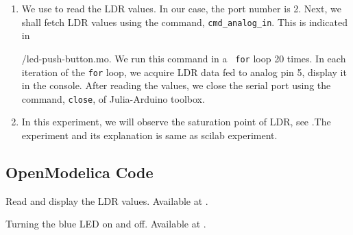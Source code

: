 \begin{enumerate}
\item We use  to read the LDR values. In
  our case, the port number is 2. Next, we shall fetch LDR values
  using the command, {\tt cmd\_analog\_in}. This is indicated in 
  
  {\LocPushOpenModelicacode/led-push-button.mo}. We run this command in a {\tt
    for} loop 20 times. In each iteration of the {\tt for} loop, we
  acquire LDR data fed to analog pin 5, display it in the console. 
  After reading the values, we close the serial port using the
  command, {\tt close}, of Julia-Arduino toolbox.

\item In this experiment, we will observe the saturation point of LDR,
  see .The experiment and its explanation is same 
  as scilab experiment.
\end{enumerate}

\subsection{OpenModelica Code}
\label{sec:ldr-OpenModelica-code}

\begin{OpenModelicacode}
{Read and display the LDR values.  Available at
  .}
\label{OpenModelica:ldr-read}

\end{OpenModelicacode}

\begin{OpenModelicacode}
{Turning the blue LED on and off.  Available at
  .}
\label{OpenModelica:ldr-led}

\end{OpenModelicacode}







